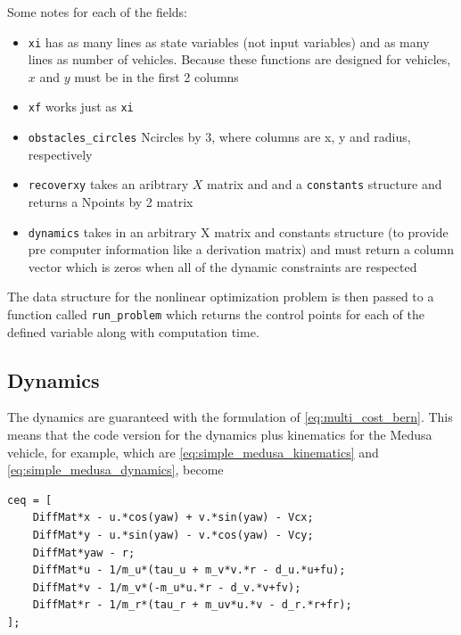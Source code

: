 \par Some notes for each of the fields:

\begin{itemize}
    \item \texttt{xi} has as many lines as state variables (not input variables) and as many lines as number of vehicles. Because these functions are designed for vehicles, $x$ and $y$ must be in the first 2 columns
    \item \texttt{xf} works just as \texttt{xi}
    \item \texttt{obstacles\_circles}  Ncircles by 3, where columns are x, y and radius, respectively
    \item \texttt{recoverxy} takes an aribtrary $X$ matrix and and a \texttt{constants} structure and returns a Npoints by 2 matrix
    \item \texttt{dynamics} takes in an arbitrary X matrix and constants structure (to provide pre computer information like a derivation matrix) and must return a column vector which is zeros when all of the dynamic constraints are respected
\end{itemize}

\par The data structure for the nonlinear optimization problem is then passed to a function called \texttt{run\_problem} which returns the control points for each of the defined variable along with computation time.

\subsection{Dynamics}
\label{sec:dynamics}

\par The dynamics are guaranteed with the formulation of \ref{eq:multi_cost_bern}. This means that the code version for the dynamics plus kinematics for the Medusa vehicle, for example, which are  \ref{eq:simple_medusa_kinematics} and \ref{eq:simple_medusa_dynamics}, become

\begin{lstlisting}[language=matlabfloz,caption={\mcode{Dynamics Equality Constraint}}]
ceq = [
    DiffMat*x - u.*cos(yaw) + v.*sin(yaw) - Vcx;
    DiffMat*y - u.*sin(yaw) - v.*cos(yaw) - Vcy;
    DiffMat*yaw - r;
    DiffMat*u - 1/m_u*(tau_u + m_v*v.*r - d_u.*u+fu);
    DiffMat*v - 1/m_v*(-m_u*u.*r - d_v.*v+fv);
    DiffMat*r - 1/m_r*(tau_r + m_uv*u.*v - d_r.*r+fr);
];
\end{lstlisting}

